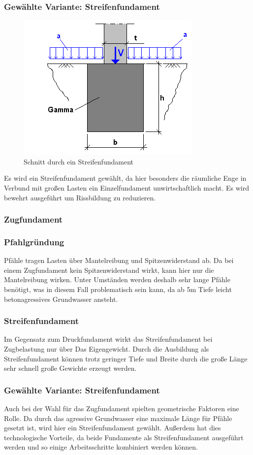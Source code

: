 \documentclass[11pt,fleqn,a4paper,halfparskip]{article}
\begin{document}
\subsubsection*{Gewählte Variante: Streifenfundament}
\begin{figure}[h!]
\includegraphics[scale=2]{Streifenfundament.png}
\caption{Schnitt durch ein Streifenfundament \cite{streifenfundament}}
\end{figure}
Es wird ein Streifenfundament gewählt, da hier besonders die räumliche Enge in Verbund mit großen Lasten ein Einzelfundament unwirtschaftlich macht. Es wird bewehrt ausgeführt um Rissbildung zu reduzieren. 
\subsubsection{Zugfundament}
\subsubsection*{Pfahlgründung}
Pfähle tragen Lasten über Mantelreibung und Spitzenwiderstand ab. Da bei einem Zugfundament kein Spitzenwiderstand wirkt, kann hier nur die Mantelreibung wirken. Unter Umständen werden deshalb sehr lange Pfähle benötigt, was in diesem Fall problematisch sein kann, da ab 5m Tiefe leicht betonagressives Grundwasser ansteht.
\subsubsection*{Streifenfundament}
Im Gegensatz zum Druckfundament wirkt das Streifenfundament bei Zugbelastung nur über Das Eigengewicht. Durch die Ausbildung als Streifenfundament können trotz geringer Tiefe und Breite durch die große Länge sehr schnell große Gewichte erzeugt werden.
\subsubsection*{Gewählte Variante: Streifenfundament}
Auch bei der Wahl für das Zugfundament spielten geometrische Faktoren eine Rolle. Da durch das agressive Grundwasser eine maximale Länge für Pfähle gesetzt ist, wird hier ein Streifenfundament gewählt. Außerdem hat dies technologische Vorteile, da beide Fundamente als Streifenfundament ausgeführt werden und so einige Arbeitsschritte kombiniert werden können.
\end{document}
